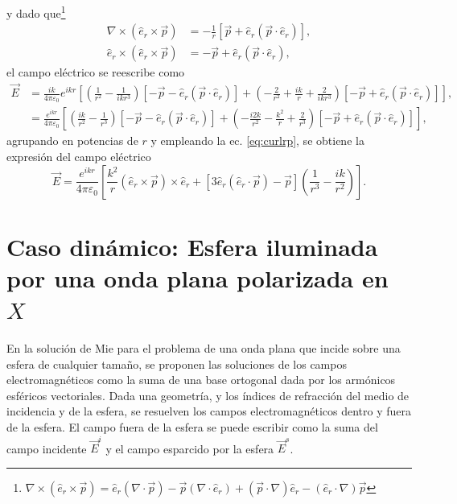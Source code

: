 \documentclass[letterpaper, 12pt] {article}
\newcommand{\er}{\ensuremath{\hat{e}_r}}
\begin{document}
y dado que\footnote{$\nabla\times\left(\er\times\vec{p}\right) = \er\left(\nabla\cdot\vec{p}\right) - \vec{p}\left(\nabla\cdot\er\right) + \left(\vec{p}\cdot\nabla\right)\er - \left(\er\cdot\nabla\right)\vec{p} $}  
\begin{align}
\nabla\times\left( \er\times\vec{p}\right) &= -\frac{1}{r} \left[\vec{p} + \er\left(\vec{p}\cdot\er\right)\right]\label{eq:curlrp},\\
\er\times \left( \er\times\vec{p}  \right)  &= -\vec{p}+  \er\left(\vec{p}\cdot\er\right) \label{eq:rp},
\end{align}
 el campo eléctrico se reescribe como
\begin{align*}
\vec{E} &=	\frac{ik}{4\pi\varepsilon_0}  e^{ikr}  \left[ \left(\frac{1}{r^2} -\frac{1}{ik r^3} \right) \left[-\vec{p} - \er\left(\vec{p}\cdot\er\right)\right] +
			\left( -\frac{2}{r^2} +\frac{ik}{r} + \frac{2}{ikr^3} \right)   \left[  -\vec{p}+  \er\left(\vec{p}\cdot\er\right)\right] \right],\\
		 &=	\frac{e^{ikr}}{4\pi\varepsilon_0}    \left[ \left(\frac{ik}{r^2} -\frac{1}{r^3} \right) \left[-\vec{p} - \er\left(\vec{p}\cdot\er\right)\right] +
			\left( -\frac{i2k}{r^2} -\frac{k^2}{r} + \frac{2}{r^3} \right)   \left[  -\vec{p}+  \er\left(\vec{p}\cdot\er\right)\right] \right],			
\end{align*}
agrupando en potencias de $r$ y empleando la ec. \eqref{eq:curlrp}, se obtiene la expresión del campo eléctrico  
\begin{equation}
\vec{E}  = 	\frac{e^{ikr}}{4\pi\varepsilon_0}   \left[ \frac{k^2}{r} (\er\times\vec{p})\times \er + 
			[3\er(\er\cdot\vec{p})-\vec{p}] \left(\frac{1}{r^3}-\frac{ik}{r^2}\right)  \right]. \label{eq:ELejanoFull}
\end{equation}


\section{Caso dinámico: Esfera iluminada por una onda plana polarizada en $X$}

En la solución de Mie para el problema de una onda plana que incide sobre una esfera de cualquier tamaño, se proponen las soluciones de los campos electromagnéticos como la suma de una base ortogonal dada por los armónicos esféricos vectoriales. Dada una geometría, y los índices de refracción del medio de incidencia y de la esfera, se resuelven los campos electromagnéticos dentro y fuera de la esfera. El campo fuera de la esfera se puede escribir como la suma del campo incidente $\vec{E}^i$ y el campo esparcido por la esfera $\vec{E}^s$. \\
\end{document}
